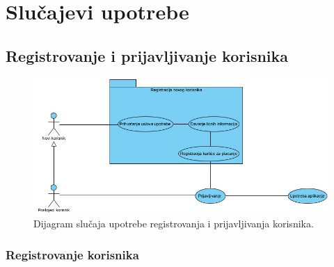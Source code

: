 \section{\bfseries Slu\v cajevi upotrebe}

\subsection{\bfseries Registrovanje i prijavljivanje korisnika}
\begin{figure}[H]
\begin{center}
\includegraphics[width=\textwidth]{Slike/UseCaseZaRegLog.jpg}
\end{center}
    \caption{Dijagram slučaja upotrebe registrovanja i prijavljivanja korisnika.}
\label{fig:RegistracijaPrijavljivanje}
\end{figure}

\subsubsection{\bfseries Registrovanje korisnika}

